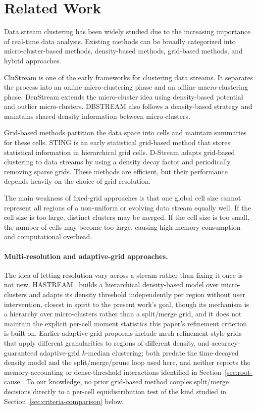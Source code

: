 \documentclass[11pt]{article}
\begin{document}
\section{Related Work}

Data stream clustering has been widely studied due to the increasing importance of real-time data analysis. Existing methods can be broadly categorized into micro-cluster-based methods, density-based methods, grid-based methods, and hybrid approaches.

CluStream is one of the early frameworks for clustering data streams. It separates the process into an online micro-clustering phase and an offline macro-clustering phase. DenStream extends the micro-cluster idea using density-based potential and outlier micro-clusters. DBSTREAM also follows a density-based strategy and maintains shared density information between micro-clusters.

Grid-based methods partition the data space into cells and maintain summaries for these cells. STING is an early statistical grid-based method that stores statistical information in hierarchical grid cells. D-Stream adapts grid-based clustering to data streams by using a density decay factor and periodically removing sparse grids. These methods are efficient, but their performance depends heavily on the choice of grid resolution.

The main weakness of fixed-grid approaches is that one global cell size cannot represent all regions of a non-uniform or evolving data stream equally well. If the cell size is too large, distinct clusters may be merged. If the cell size is too small, the number of cells may become too large, causing high memory consumption and computational overhead.

\paragraph{Multi-resolution and adaptive-grid approaches.} The idea of letting resolution vary across a stream rather than fixing it once is not new. HASTREAM~\cite{Hassani2014HASTREAM} builds a hierarchical density-based model over micro-clusters and adapts its density threshold independently per region without user intervention, closest in spirit to the present work's goal, though its mechanism is a hierarchy over micro-clusters rather than a split/merge grid, and it does not maintain the explicit per-cell moment statistics this paper's refinement criterion is built on. Earlier adaptive-grid proposals include mesh-refinement-style grids that apply different granularities to regions of different density, and accuracy-guaranteed adaptive-grid $k$-median clustering; both predate the time-decayed density model and the split/merge/prune loop used here, and neither reports the memory-accounting or dense-threshold interactions identified in Section~\ref{sec:root-cause}. To our knowledge, no prior grid-based method couples split/merge decisions directly to a per-cell equidistribution test of the kind studied in Section~\ref{sec:criteria-comparison} below.
\end{document}

